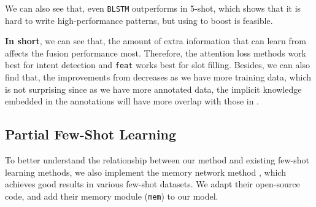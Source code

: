 
We can also see that, even \texttt{BLSTM} outperforms \RE in 5-shot, which shows that it is hard to write high-performance \RE patterns, but using \RE to boost \NN is feasible.

\vspace{1.5mm}\noindent\textbf{In short}, 
we can see that, the amount of extra information that \NN can learn from \RE affects the fusion performance most. Therefore, the attention loss methods work best for intent detection and \texttt{feat} works best for slot filling.
Besides, we can also find that, the improvements from \RE decreases as we have more training data, which is not surprising since as we have more annotated data, the implicit knowledge embedded in the annotations will have more overlap with those in \RE.


\subsection{Partial Few-Shot Learning}
To better understand the relationship between our method and existing few-shot learning methods, we also implement the memory network method \cite{kaiser2017learning}, which achieves good results in various few-shot datasets. We adapt their open-source code, and add their memory module (\texttt{mem}) to our \BLSTM model.

